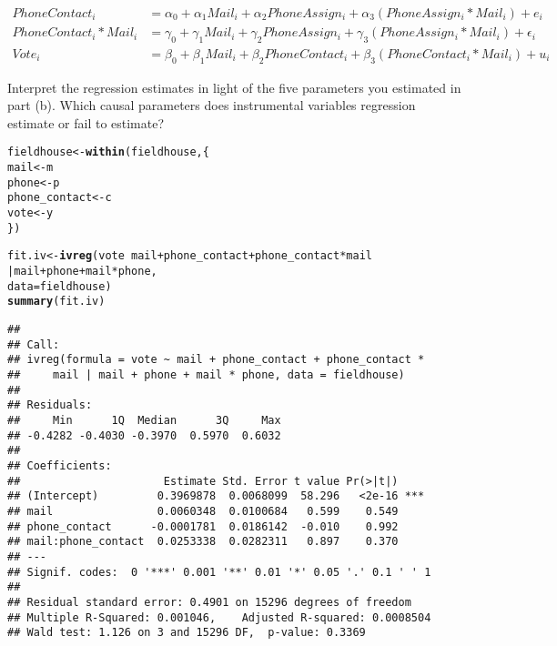 \documentclass[11pt,notitlepage]{article}\usepackage[]{graphicx}\usepackage[]{color}
\makeatletter
\newcommand{\hlopt}[1]{\textcolor[rgb]{0,0,0}{#1}}%
\newcommand{\hlstd}[1]{\textcolor[rgb]{0.345,0.345,0.345}{#1}}%
\newcommand{\hlkwb}[1]{\textcolor[rgb]{0.69,0.353,0.396}{#1}}%
\newcommand{\hlkwc}[1]{\textcolor[rgb]{0.333,0.667,0.333}{#1}}%
\newcommand{\hlkwd}[1]{\textcolor[rgb]{0.737,0.353,0.396}{\textbf{#1}}}%
\newenvironment{kframe}{%
 \def\at@end@of@kframe{}%
 \ifinner\ifhmode%
  \def\at@end@of@kframe{\end{minipage}}%
  \begin{minipage}{\columnwidth}%
 \fi\fi%
 \def\FrameCommand##1{\hskip\@totalleftmargin \hskip-\fboxsep
 \colorbox{shadecolor}{##1}\hskip-\fboxsep
     \hskip-\linewidth \hskip-\@totalleftmargin \hskip\columnwidth}%
 \MakeFramed {\advance\hsize-\width
   \@totalleftmargin\z@ \linewidth\hsize
   \@setminipage}}%
 {\par\unskip\endMakeFramed%
 \at@end@of@kframe}
\newenvironment{knitrout}{}{} %
\makeatother
\begin{document}
\begin{enumerate}[a)]
\begin{align*}
PhoneContact_i &= \alpha_0 + \alpha_1 Mail_i + \alpha_2 PhoneAssign_i + \alpha_3(PhoneAssign_i * Mail_i) + e_i \\
PhoneContact_i * Mail_i &= \gamma_0 + \gamma_1 Mail_i + \gamma_2 PhoneAssign_i + \gamma_3(PhoneAssign_i *
Mail_i) + \epsilon_i \\
Vote_i &= \beta_0 + \beta_1 Mail_i + \beta_2 PhoneContact_i + \beta_3(PhoneContact_i * Mail_i) + u_i
\end{align*}

Interpret the regression estimates in light of the five parameters you estimated in part (b). Which causal parameters does instrumental variables regression estimate or fail to estimate?


\begin{knitrout}
\color{fgcolor}\begin{kframe}
\begin{alltt}
\hlstd{fieldhouse} \hlkwb{<-} \hlkwd{within}\hlstd{(fieldhouse,\{}
  \hlstd{mail} \hlkwb{<-} \hlstd{m}
  \hlstd{phone} \hlkwb{<-} \hlstd{p}
  \hlstd{phone_contact} \hlkwb{<-} \hlstd{c}
  \hlstd{vote} \hlkwb{<-} \hlstd{y}
\hlstd{\})}

\hlstd{fit.iv} \hlkwb{<-} \hlkwd{ivreg}\hlstd{(vote} \hlopt{~} \hlstd{mail} \hlopt{+} \hlstd{phone_contact} \hlopt{+} \hlstd{phone_contact} \hlopt{*} \hlstd{mail}
                \hlopt{|} \hlstd{mail} \hlopt{+} \hlstd{phone} \hlopt{+} \hlstd{mail} \hlopt{*} \hlstd{phone,}
                \hlkwc{data} \hlstd{= fieldhouse)}
\hlkwd{summary}\hlstd{(fit.iv)}
\end{alltt}
\begin{verbatim}
## 
## Call:
## ivreg(formula = vote ~ mail + phone_contact + phone_contact * 
##     mail | mail + phone + mail * phone, data = fieldhouse)
## 
## Residuals:
##     Min      1Q  Median      3Q     Max 
## -0.4282 -0.4030 -0.3970  0.5970  0.6032 
## 
## Coefficients:
##                      Estimate Std. Error t value Pr(>|t|)    
## (Intercept)         0.3969878  0.0068099  58.296   <2e-16 ***
## mail                0.0060348  0.0100684   0.599    0.549    
## phone_contact      -0.0001781  0.0186142  -0.010    0.992    
## mail:phone_contact  0.0253338  0.0282311   0.897    0.370    
## ---
## Signif. codes:  0 '***' 0.001 '**' 0.01 '*' 0.05 '.' 0.1 ' ' 1
## 
## Residual standard error: 0.4901 on 15296 degrees of freedom
## Multiple R-Squared: 0.001046,	Adjusted R-squared: 0.0008504 
## Wald test: 1.126 on 3 and 15296 DF,  p-value: 0.3369
\end{verbatim}
\end{kframe}
\end{knitrout}


\end{enumerate}
\end{document}

